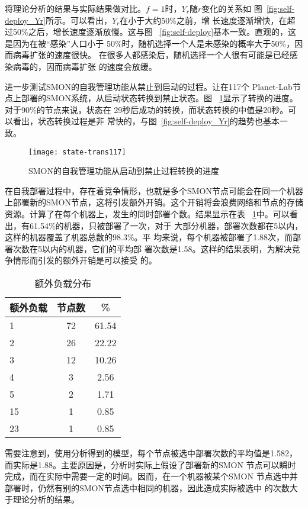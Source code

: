 将理论分析的结果与实际结果做对比。$f=1$时，$Y_r$随$r$变化的关系如
图~\ref{fig:self-deploy_Yr}所示。可以看出，$Y_r$在小于大约50\%之前，增
长速度逐渐增快，在超过50\%之后，增长速度逐渐放慢。这与图~
\ref{fig:self-deploy}基本一致。直观的，这是因为在被“感染”人口小于
50\%时，随机选择一个人是未感染的概率大于50\%，因而病毒扩张的速度很快。
在很多人都感染后，随机选择一个人很有可能是已经感染病毒的，因而病毒扩张
的速度会放缓。


进一步测试SMON的自我管理功能从禁止到启动的过程。让在117个
Planet-Lab节点上部署的SMON系统，从启动状态转换到禁止状态。图~
\ref{fig:state-transition}显示了转换的进度。对于90\%的节点来说，状态在
29秒后成功的转换，而状态转换的中值是20秒。可以看出，状态转换过程是非
常快的，与图~\ref{fig:self-deploy_Yr}的趋势也基本一致。

\begin{figure}[htbp]
\centering
  \begin{minipage}{0.6\linewidth}
    \centering
    \texttt{[image: state-trans117]}
    \caption{SMON的自我管理功能从启动到禁止过程转换的进度}
    \label{fig:state-transition}
  \end{minipage}
\end{figure}

在自我部署过程中，存在着竞争情形，也就是多个SMON节点可能会在同一个机器
上部署新的SMON节点，这将引发额外开销。这个开销将会浪费网络和节点的存储
资源。计算了在每个机器上，发生的同时部署个数。结果显示在表~
\ref{fig:overhead}中。可以看出，有61.54\%的机器，只被部署了一次，对于
大部分机器，部署次数都在5以内，这样的机器覆盖了机器总数的98.3\%。平
均来说，每个机器被部署了1.88次，而部署次数在5以内的机器，它们的平均部
署次数是1.58。这样的结果表明，为解决竞争情形而引发的额外开销是可以接受
的。
\begin{table}[htbp]
\centering
\caption{额外负载分布}
\label{fig:overhead}
\begin{tabular}{lcc}
    \toprule[1.5pt]
额外负载 & 节点数 & \% \\
    \midrule[1pt]
1 & 72 & 61.54 \\
2 & 26 & 22.22 \\
3 & 12 & 10.26 \\
4 & 3 & 2.56 \\
5 & 2 & 1.71 \\
15 & 1 & 0.85 \\
23 & 1 & 0.85 \\
    \bottomrule[1.5pt]
\end{tabular}
\end{table}
需要注意到，使用分析得到的模型，每个节点被选中部署次数的平均值是1.582，
而实际是1.88。主要原因是，分析时实际上假设了部署新的SMON
节点可以瞬时完成，而在实际中需要一定的时间。因而，在一个机器被某个SMON
节点选中并部署时，仍然有别的SMON节点选中相同的机器，因此造成实际被选中
的次数大于理论分析的结果。

